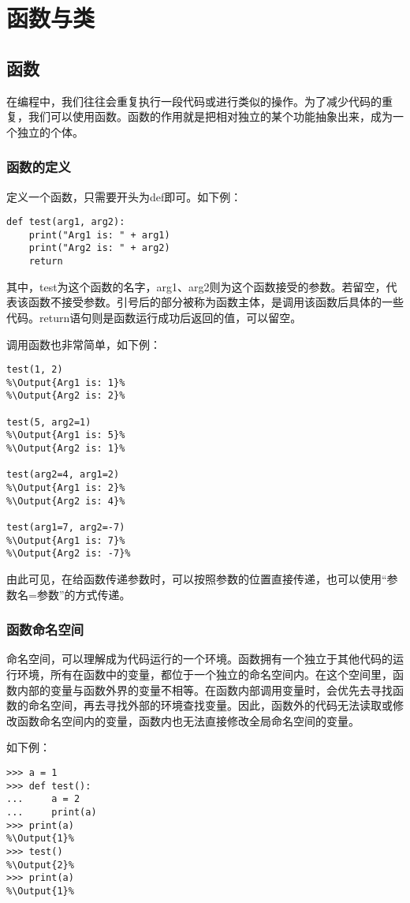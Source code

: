 \section{函数与类\PyOnly }

\subsection{函数}
在编程中，我们往往会重复执行一段代码或进行类似的操作。为了减少代码的重复，我们可以使用函数。函数的作用就是把相对独立的某个功能抽象出来，成为一个独立的个体。

\subsubsection{函数的定义}
定义一个函数，只需要开头为def即可。如下例：
\begin{lstlisting}
def test(arg1, arg2):
    print("Arg1 is: " + arg1)
    print("Arg2 is: " + arg2)
    return
\end{lstlisting}

其中，test为这个函数的名字，arg1、arg2则为这个函数接受的参数。若留空，代表该函数不接受参数。引号后的部分被称为函数主体，是调用该函数后具体的一些代码。return语句则是函数运行成功后返回的值，可以留空。

调用函数也非常简单，如下例：
\begin{lstlisting}
test(1, 2)
%\Output{Arg1 is: 1}%
%\Output{Arg2 is: 2}%

test(5, arg2=1)
%\Output{Arg1 is: 5}%
%\Output{Arg2 is: 1}%

test(arg2=4, arg1=2)
%\Output{Arg1 is: 2}%
%\Output{Arg2 is: 4}%

test(arg1=7, arg2=-7)
%\Output{Arg1 is: 7}%
%\Output{Arg2 is: -7}%
\end{lstlisting}

由此可见，在给函数传递参数时，可以按照参数的位置直接传递，也可以使用“参数名=参数”的方式传递。

\subsubsection{函数命名空间}
命名空间，可以理解成为代码运行的一个环境。函数拥有一个独立于其他代码的运行环境，所有在函数中的变量，都位于一个独立的命名空间内。在这个空间里，函数内部的变量与函数外界的变量不相等。在函数内部调用变量时，会优先去寻找函数的命名空间，再去寻找外部的环境查找变量。因此，函数外的代码无法读取或修改函数命名空间内的变量，函数内也无法直接修改全局命名空间的变量。

如下例：
\begin{lstlisting}
>>> a = 1
>>> def test():
...     a = 2
...     print(a)
>>> print(a)
%\Output{1}%
>>> test()
%\Output{2}%
>>> print(a)
%\Output{1}%
\end{lstlisting}

